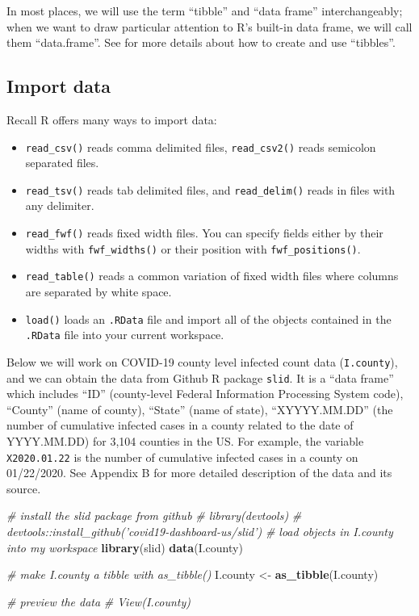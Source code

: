 \documentclass[]{book}
\newenvironment{Shaded}{\begin{snugshade}}{\end{snugshade}}
\newcommand{\KeywordTok}[1]{\textcolor[rgb]{0.13,0.29,0.53}{\textbf{#1}}}
\newcommand{\StringTok}[1]{\textcolor[rgb]{0.31,0.60,0.02}{#1}}
\newcommand{\CommentTok}[1]{\textcolor[rgb]{0.56,0.35,0.01}{\textit{#1}}}
\newcommand{\NormalTok}[1]{#1}
\begin{document}
In most places, we will use the term ``tibble'' and ``data frame''
interchangeably; when we want to draw particular attention to R's
built-in data frame, we will call them ``data.frame''. See
\citet{wickham2016r} for more details about how to create and use
``tibbles''.

\subsection{Import data}\label{import-data}

Recall R offers many ways to import data:

\begin{itemize}
\item
  \texttt{read\_csv()} reads comma delimited files,
  \texttt{read\_csv2()} reads semicolon separated files.
\item
  \texttt{read\_tsv()} reads tab delimited files, and
  \texttt{read\_delim()} reads in files with any delimiter.
\item
  \texttt{read\_fwf()} reads fixed width files. You can specify fields
  either by their widths with \texttt{fwf\_widths()} or their position
  with \texttt{fwf\_positions()}.
\item
  \texttt{read\_table()} reads a common variation of fixed width files
  where columns are separated by white space.
\item
  \texttt{load()} loads an \texttt{.RData} file and import all of the
  objects contained in the \texttt{.RData} file into your current
  workspace.
\end{itemize}

Below we will work on COVID-19 county level infected count data
(\texttt{I.county}), and we can obtain the data from Github R package
\texttt{slid}. It is a ``data frame'' which includes ``ID''
(county-level Federal Information Processing System code), ``County''
(name of county), ``State'' (name of state), ``XYYYY.MM.DD'' (the number
of cumulative infected cases in a county related to the date of
YYYY.MM.DD) for 3,104 counties in the US. For example, the variable
\texttt{X2020.01.22} is the number of cumulative infected cases in a
county on 01/22/2020. See Appendix B for more detailed description of
the data and its source.

\begin{Shaded}
\begin{Highlighting}[]
\CommentTok{# install the slid package from github}
\CommentTok{# library(devtools)}
\CommentTok{# devtools::install_github('covid19-dashboard-us/slid')}
\CommentTok{# load objects in I.county into my workspace}
\KeywordTok{library}\NormalTok{(slid)}
\KeywordTok{data}\NormalTok{(I.county)}

\CommentTok{# make I.county a tibble with as_tibble()}
\NormalTok{I.county <-}\StringTok{ }\KeywordTok{as_tibble}\NormalTok{(I.county)}

\CommentTok{# preview the data}
\CommentTok{# View(I.county)}
\end{Highlighting}
\end{Shaded}
\end{document}
